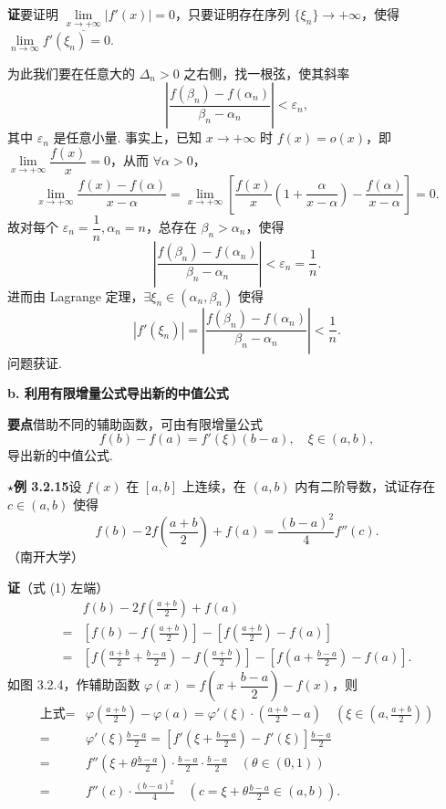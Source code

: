 \documentclass[UTF8,12pt,a4paper,fontset=fandol]{ctexart}
\begin{document}
\noindent\textbf{证}\quad 要证明 $\underline{\lim\limits_{x\to+\infty}}|f'(x)|=0$，只要证明存在序列 $\{\xi_n\}\to+\infty$，使得 $\lim\limits_{n\to\infty}f'(\xi_n)=0$.

为此我们要在任意大的 $\Delta_n>0$ 之右侧，找一根弦，使其斜率
\[
  \left|\frac{f(\beta_n)-f(\alpha_n)}{\beta_n-\alpha_n}\right|<\varepsilon_n,
\]
其中 $\varepsilon_n$ 是任意小量. 事实上，已知 $x\to+\infty$ 时 $f(x)=o(x)$，即 $\lim\limits_{x\to+\infty}\dfrac{f(x)}x=0$，从而 $\forall\alpha>0$，
\[
  \lim_{x\to+\infty}\frac{f(x)-f(\alpha)}{x-\alpha}
  =\lim_{x\to+\infty}\left[\frac{f(x)}x\left(1+\frac{\alpha}{x-\alpha}\right)-\frac{f(\alpha)}{x-\alpha}\right]=0.
\]
故对每个 $\varepsilon_n=\dfrac1n,\alpha_n=n$，总存在 $\beta_n>\alpha_n$，使得
\[
  \left|\frac{f(\beta_n)-f(\alpha_n)}{\beta_n-\alpha_n}\right|<\varepsilon_n=\frac1n.
\]
进而由 Lagrange 定理，$\exists\xi_n\in(\alpha_n,\beta_n)$ 使得
\[
  |f'(\xi_n)|=\left|\frac{f(\beta_n)-f(\alpha_n)}{\beta_n-\alpha_n}\right|<\frac1n.
\]
问题获证.

\noindent\textbf{b. 利用有限增量公式导出新的中值公式}

\noindent\textbf{要点}\quad 借助不同的辅助函数，可由有限增量公式
\[
  f(b)-f(a)=f'(\xi)(b-a),\quad \xi\in(a,b),
\]
导出新的中值公式.

\noindent\textbf{$\star$例 3.2.15}\quad 设 $f(x)$ 在 $[a,b]$ 上连续，在 $(a,b)$ 内有二阶导数，试证存在 $c\in(a,b)$ 使得
\begin{equation}
  f(b)-2f\left(\frac{a+b}{2}\right)+f(a)=\frac{(b-a)^2}{4}f''(c).
\tag{1}
\end{equation}
（南开大学）

\noindent\textbf{证}\quad （式 (1) 左端）
\[
\begin{aligned}
& f(b)-2f\left(\frac{a+b}{2}\right)+f(a)\\
={}&\left[f(b)-f\left(\frac{a+b}{2}\right)\right]
-\left[f\left(\frac{a+b}{2}\right)-f(a)\right]\\
={}&\left[f\left(\frac{a+b}{2}+\frac{b-a}{2}\right)-f\left(\frac{a+b}{2}\right)\right]
-\left[f\left(a+\frac{b-a}{2}\right)-f(a)\right].
\end{aligned}
\]
如图 3.2.4，作辅助函数 $\varphi(x)=f\left(x+\dfrac{b-a}{2}\right)-f(x)$，则
\[
\begin{aligned}
\text{上式}
={}&\varphi\left(\frac{a+b}{2}\right)-\varphi(a)
=\varphi'(\xi)\cdot\left(\frac{a+b}{2}-a\right)
\quad\left(\xi\in\left(a,\frac{a+b}{2}\right)\right)\\
={}&\varphi'(\xi)\frac{b-a}{2}
=\left[f'\left(\xi+\frac{b-a}{2}\right)-f'(\xi)\right]\frac{b-a}{2}\\
={}&f''\left(\xi+\theta\frac{b-a}{2}\right)\cdot\frac{b-a}{2}\cdot\frac{b-a}{2}\quad(\theta\in(0,1))\\
={}&f''(c)\cdot\frac{(b-a)^2}{4}
\quad\left(c=\xi+\theta\frac{b-a}{2}\in(a,b)\right).
\end{aligned}
\]
\end{document}
